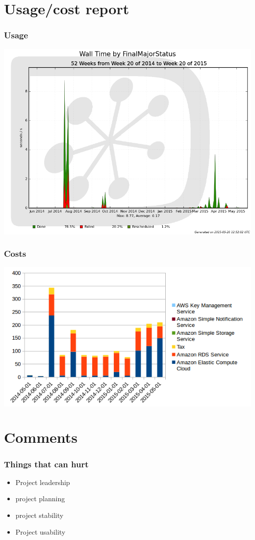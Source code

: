 \documentclass[14pt]{beamer}
\begin{document}
\section{Usage/cost report}
\begin{frame}
\frametitle{Usage}
\centering
\includegraphics[width=\textwidth]{walltime.png}
\end{frame}

\begin{frame}
\frametitle{Costs}
\centering
\includegraphics[width=\textwidth]{awscosts.png}
\end{frame}

\section{Comments}
\begin{frame}
\frametitle{Things that can hurt}
\begin{itemize}
\item Project leadership
\item project planning
\item project stability
\item Project usability
\end{itemize}
\end{frame}
\end{document}
